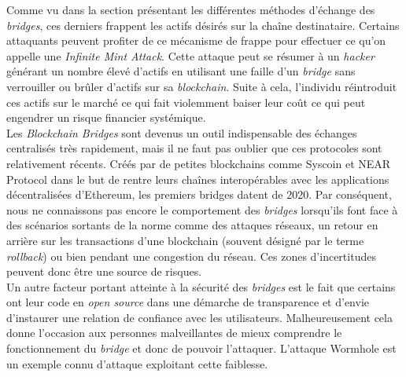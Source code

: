 Comme vu dans la section présentant les différentes méthodes d’échange des \textit{bridges}, ces derniers frappent les actifs désirés sur la chaîne destinataire. Certains attaquants peuvent profiter de ce mécanisme de frappe pour effectuer ce qu’on appelle une \textit{Infinite Mint Attack}.\cite{ChainLinkRisks} Cette attaque peut se résumer à un \textit{hacker} générant un nombre élevé d’actifs en utilisant une faille d’un \textit{bridge} sans verrouiller ou brûler d’actifs sur sa \textit{blockchain}. Suite à cela, l’individu réintroduit ces actifs sur le marché ce qui fait violemment baiser leur coût ce qui peut engendrer un risque financier systémique.\\

Les \textit{Blockchain Bridges} sont devenus un outil indispensable des échanges centralisés très rapidement, mais il ne faut pas oublier que ces protocoles sont relativement récents. Créés par de petites blockchains comme Syscoin et NEAR Protocol dans le but de rentre leurs chaînes interopérables avec les applications décentralisées d’Ethereum, les premiers bridges datent de 2020\cite{Bitstamp}. Par conséquent, nous ne connaissons pas encore le comportement des \textit{bridges} lorsqu’ils font face à des scénarios sortants de la norme comme des attaques réseaux, un retour en arrière sur les transactions d’une blockchain (souvent désigné par le terme \textit{rollback}) ou bien pendant une congestion du réseau. Ces zones d’incertitudes peuvent donc être une source de risques. \\

Un autre facteur portant atteinte à la sécurité des \textit{bridges} est le fait que certains ont leur code en \textit{open source} dans une démarche de transparence et d’envie d’instaurer une relation de confiance avec les utilisateurs. Malheureusement cela donne l’occasion aux personnes malveillantes de mieux comprendre le fonctionnement du \textit{bridge} et donc de pouvoir l’attaquer. L’attaque Wormhole est un exemple connu d’attaque exploitant cette faiblesse.


